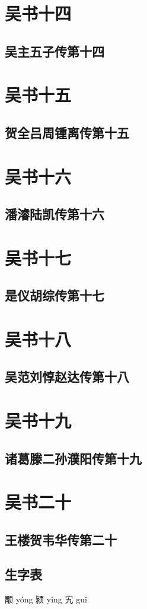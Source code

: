 \documentclass[12pt,UTF8]{ctexbook}
\begin{document}
\part{吴书十四}
\chapter{吴主五子传第十四}

\part{吴书十五}
\chapter{贺全吕周锺离传第十五}

\part{吴书十六}
\chapter{潘濬陆凯传第十六}

\part{吴书十七}
\chapter{是仪胡综传第十七}

\part{吴书十八}
\chapter{吴范刘惇赵达传第十八}

\part{吴书十九}
\chapter{诸葛滕二孙濮阳传第十九}

\part{吴书二十}
\chapter{王楼贺韦华传第二十}

\backmatter
\chapter{生字表}

颙 y\'ong  颍 yǐng  宄 gu\v{i}
\end{document}
